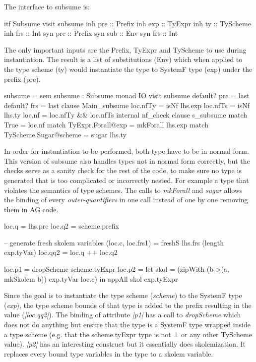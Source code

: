 The interface to subsume is:
\begin{code}
itf Subsume
  visit subsume
    inh pre  :: Prefix
    inh exp  :: TyExpr
    inh ty   :: TyScheme
    inh frs  :: Int
    syn pre  :: Prefix
    syn sub  :: Env
    syn frs  :: Int
\end{code}
The only important inputs are the Prefix, TyExpr and TyScheme to use during instantiation. The result is a list of substitutions (Env) which when applied to the type scheme (ty) would instantiate the type to SystemF type (exp) under the  prefix (pre).


\begin{code}
subsume = sem subsume : Subsume monad IO 
             visit subsume
               default? pre = last
               default? frs = last
               clause Main_subsume
                loc.nfTy  = isNf lhs.exp
                loc.nfTs  = isNf lhs.ty
                loc.nf    = loc.nfTy && loc.nfTs
                internal nf_check
                    clause s_subsume
                      match True                   = loc.nf
                      match TyExpr.Forall@exp      = mkForall lhs.exp
                      match TyScheme.Sugar@scheme  = sugar lhs.ty
\end{code}
In order for instantiation to be performed, both type have to be in normal form. This version of subsume also handles types not in normal form correctly, but the checks serve as a sanity check for the rest of the code, to make sure no type is  generated that is too complicated or incorrectly nested. For example a type that violates the semantics of type schemes.
The calls to \emph{mkForall} and \emph{sugar} allows the binding of every \emph{outer-quantifiers} in one call instead of one by one removing them in AG code.

\begin{code}
loc.q   = lhs.pre
loc.q2  = scheme.prefix

-- generate fresh skolem variables
(loc.c, loc.frs1) = freshS lhs.frs (length exp.tyVar)
loc.qq2 = loc.q ++ loc.q2

loc.p1  = dropScheme scheme.tyExpr
loc.p2  =  let skol = (zipWith (\a b->(a, mkSkolem b)) exp.tyVar loc.c)
           in  appAll skol exp.tyExpr
\end{code}
Since the goal is to instantiate the type scheme (\emph{scheme}) to the SystemF type (\emph{exp}), the type scheme bounds of that type is added to the prefix resulting in the value (\emph{|loc.qq2|}). 
The binding of attribute \emph{|p1|} has a call to \emph{dropScheme} which does not do anything but ensure that the type is a SystemF type wrapped inside a type scheme (e.g. that the scheme.tyExpr type is not $\bot$ or any other TyScheme value). \emph{|p2|} has an interesting construct but it essentially does skolemization. It replaces every bound type variables in the type to a skolem variable.

